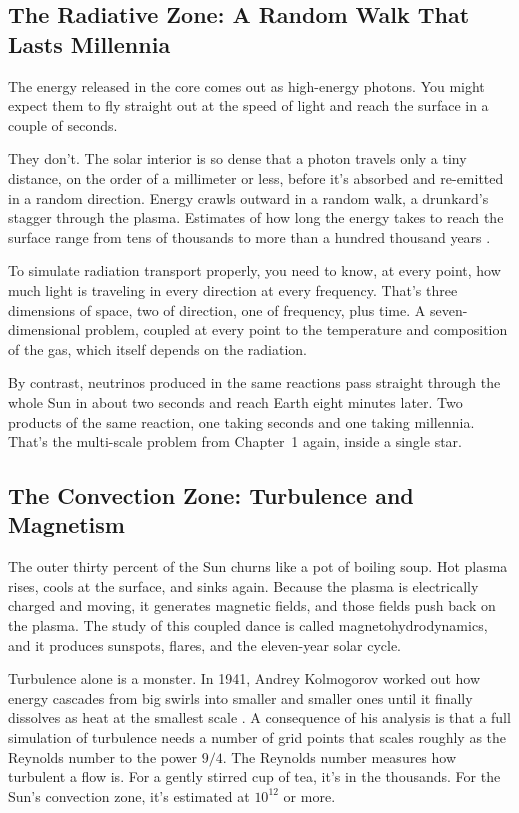 \subsection{The Radiative Zone: A Random Walk That Lasts Millennia}

The energy released in the core comes out as high-energy photons. You might expect them to fly straight out at the speed of light and reach the surface in a couple of seconds.

They don't. The solar interior is so dense that a photon travels only a tiny distance, on the order of a millimeter or less, before it's absorbed and re-emitted in a random direction. Energy crawls outward in a random walk, a drunkard's stagger through the plasma. Estimates of how long the energy takes to reach the surface range from tens of thousands to more than a hundred thousand years \cite{mitalas1992}.

To simulate radiation transport properly, you need to know, at every point, how much light is traveling in every direction at every frequency. That's three dimensions of space, two of direction, one of frequency, plus time. A seven-dimensional problem, coupled at every point to the temperature and composition of the gas, which itself depends on the radiation.

By contrast, neutrinos produced in the same reactions pass straight through the whole Sun in about two seconds and reach Earth eight minutes later. Two products of the same reaction, one taking seconds and one taking millennia. That's the multi-scale problem from Chapter~1 again, inside a single star.

\subsection{The Convection Zone: Turbulence and Magnetism}

The outer thirty percent of the Sun churns like a pot of boiling soup. Hot plasma rises, cools at the surface, and sinks again. Because the plasma is electrically charged and moving, it generates magnetic fields, and those fields push back on the plasma. The study of this coupled dance is called magnetohydrodynamics, and it produces sunspots, flares, and the eleven-year solar cycle.

Turbulence alone is a monster. In 1941, Andrey Kolmogorov worked out how energy cascades from big swirls into smaller and smaller ones until it finally dissolves as heat at the smallest scale \cite{kolmogorov1941}. A consequence of his analysis is that a full simulation of turbulence needs a number of grid points that scales roughly as the Reynolds number to the power \(9/4\). The Reynolds number measures how turbulent a flow is. For a gently stirred cup of tea, it's in the thousands. For the Sun's convection zone, it's estimated at \(10^{12}\) or more.

